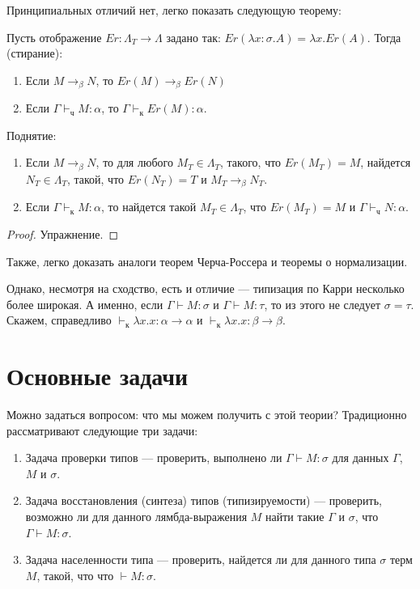 Принципиальных отличий нет, легко показать следующую теорему:
\begin{theorem}
Пусть отображение $Er: \Lambda_T \rightarrow \Lambda$ задано так:
$Er(\lambda x:\sigma.A) = \lambda x.Er(A)$. Тогда (стирание):

\begin{enumerate}
\item Если $M\rightarrow_\beta N$, то $Er(M)\rightarrow_\beta Er(N)$
\item Если $\Gamma\vdash_\texttt{ч} M:\alpha$, то $\Gamma\vdash_\texttt{к} Er(M):\alpha$.
\end{enumerate}

Поднятие:
\begin{enumerate}
\item Если $M\rightarrow_\beta N$, то для любого $M_T \in \Lambda_T$, такого, что $Er(M_T) = M$,
найдется $N_T \in \Lambda_T$, такой, что $Er(N_T) = T$ и $M_T \rightarrow_\beta N_T$.
\item Если $\Gamma\vdash_\texttt{к} M:\alpha$, то найдется такой $M_T\in\Lambda_T$, 
что $Er(M_T)=M$ и $\Gamma\vdash_\texttt{ч} N:\alpha$.
\end{enumerate}
\end{theorem}

\begin{proof}
Упражнение.
\end{proof}

Также, легко доказать аналоги теорем Черча-Россера и теоремы о нормализации.

Однако, несмотря на сходство, есть и отличие --- типизация по Карри несколько более
широкая. А именно, если $\Gamma\vdash M:\sigma$ и $\Gamma\vdash M:\tau$, 
то из этого не следует $\sigma=\tau$. Скажем, справедливо
$\vdash_\texttt{к}\lambda x.x : \alpha\rightarrow\alpha$ и 
$\vdash_\texttt{к}\lambda x.x : \beta\rightarrow\beta$.

\section{Основные задачи}

Можно задаться вопросом: что мы можем получить с этой теории?
Традиционно рассматривают следующие три задачи:

\begin{enumerate}
\item Задача проверки типов --- проверить, выполнено ли $\Gamma \vdash M:\sigma$ для
данных $\Gamma$, $M$ и $\sigma$.
\item Задача восстановления (синтеза) типов (типизируемости) --- проверить, возможно ли для
данного лямбда-выражения $M$ найти такие $\Gamma$ и $\sigma$, что $\Gamma \vdash M:\sigma$.
\item Задача населенности типа --- проверить, найдется ли для данного типа $\sigma$ терм $M$, такой, что
что $\vdash M:\sigma$.
\end{enumerate}

